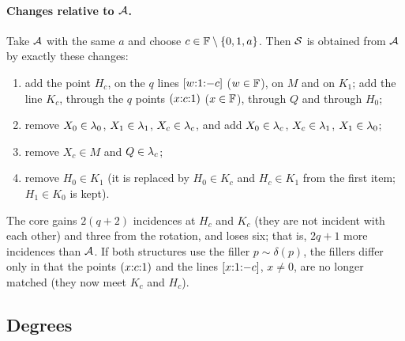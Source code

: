 \paragraph{Changes relative to $\mathcal{A}$.} Take $\mathcal{A}$ with the same $a$ and choose $c \in \mathbb{F} \setminus \{0,1,a\}$. Then $\mathcal{S}$ is obtained from $\mathcal{A}$ by exactly these changes:
\begin{enumerate}[label=\textup{($\Delta$\arabic*)},leftmargin=3em]
\item add the point $H_c$, on the $q$ lines $[{w}{:}{1}{:}{-c}]$ ($w \in \mathbb{F}$), on $M$ and on $K_1$; add the line $K_c$, through the $q$ points $({x}{:}{c}{:}{1})$ ($x \in \mathbb{F}$), through $Q$ and through $H_0$;
\item remove $X_0 \in \lambda_0$, $X_1 \in \lambda_1$, $X_c \in \lambda_c$, and add $X_0 \in \lambda_c$, $X_c \in \lambda_1$, $X_1 \in \lambda_0$;
\item remove $X_c \in M$ and $Q \in \lambda_c$;
\item remove $H_0 \in K_1$ (it is replaced by $H_0 \in K_c$ and $H_c \in K_1$ from the first item; $H_1 \in K_0$ is kept).
\end{enumerate}
The core gains $2(q+2)$ incidences at $H_c$ and $K_c$ (they are not incident with each other) and three from the rotation, and loses six; that is, $2q+1$ more incidences than $\mathcal{A}$. If both structures use the filler $p \sim \delta(p)$, the fillers differ only in that the points $({x}{:}{c}{:}{1})$ and the lines $[{x}{:}{1}{:}{-c}]$, $x \neq 0$, are no longer matched (they now meet $K_c$ and $H_c$).

\subsection{Degrees}

